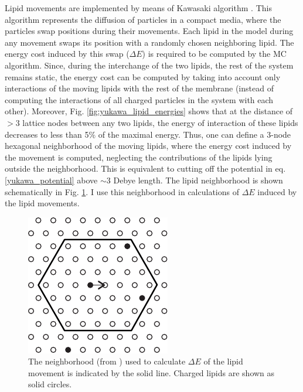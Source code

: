 Lipid movements are implemented by means of Kawasaki algorithm \cite{Kawasaki1972}. This algorithm represents the diffusion of particles in a compact media, where the particles swap positions during their movements. Each lipid in the model during any movement swaps its position with a randomly chosen neighboring lipid. The energy cost induced by this swap ($\Delta E$) is required to be computed by the MC algorithm. Since, during the interchange of the two lipids, the rest of the system remains static, the energy cost can be computed by taking into account only interactions of the moving lipids with the rest of the membrane (instead of computing the interactions of all charged particles in the system with each other). Moreover, Fig. \ref{fig:yukawa_lipid_energies} shows that at the distance of $>$3 lattice nodes between any two lipids, the energy of interaction of these lipids decreases to less than 5$\%$ of the maximal energy. Thus, one can define a 3-node hexagonal neighborhood of the moving lipids, where the energy cost induced by the movement is computed, neglecting the contributions of the lipids lying outside the neighborhood. This is equivalent to cutting off the potential in eq. \eqref{yukawa_potential} above $\sim$3 Debye length. The lipid neighborhood is shown schematically in Fig. \ref{fig:lipid_neighborhood}. I use this neighborhood in calculations of $\Delta E$ induced by the lipid movements.

\begin{figure}[!ht]
\begin{center}
  \includegraphics[scale=1.8]{../figures/lipid_neighborhood.pdf}
\end{center}
 \caption[The neighborhood used to calculate $\Delta E$ of the lipid movement]{The neighborhood (from \cite{Kiselev2011}) used to calculate $\Delta E$ of the lipid movement is indicated by the solid line. Charged lipids are shown as solid circles.}
\label{fig:lipid_neighborhood}
\end{figure}


